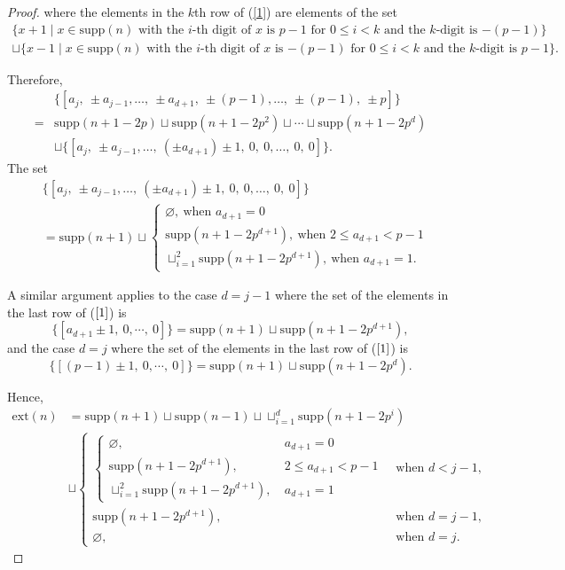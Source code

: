 \documentclass[11 pt]{amsart}
\theoremstyle{plain}
\theoremstyle{definition}
\theoremstyle{remark}
\def\supp{\text{supp}}
\def\ext{\text{ext}}
\begin{document}
\begin{proof}
where the elements in the $k$th row of (\ref{1}) are elements of the set  
\begin{align*}
  \{x+1 \mid x \in \supp (n) \text{ with the $i$-th digit of $x$ is $p-1$ for $0\le i<k$ and the $k$-digit is $-(p-1)$} \} \\
  \sqcup \{x-1 \mid x \in \supp (n) \text{ with the $i$-th digit of $x$ is $-(p-1)$ for $0\le i<k$ and the $k$-digit is $p-1$} \}.
\end{align*}

Therefore, 
\begin{align*}
 &\{[a_j,\ \pm a_{j-1}, \ldots,\ \pm  a_{d+1},\ \pm (p-1), \ldots, \ \pm (p-1), \ \pm p] \} \\
 = &\supp(n+1-2p)\sqcup \supp (n+1-2p^2) \sqcup \cdots \sqcup \supp(n+1-2p^d) \\ &\sqcup \{[a_j,\ \pm a_{j-1}, \ldots,\  (\pm a_{d+1})\pm 1,\ 0,\ 0, \ldots,  \ 0, \ 0]  
    \}. 
\end{align*}
The set 
\begin{align*}
        &\{[a_j,\ \pm a_{j-1}, \ldots,\  (\pm a_{d+1})\pm 1,\ 0,\ 0, \ldots,  \ 0, \ 0]  
    \}\\
    &=\supp(n+1) \sqcup \begin{cases}
         \varnothing,\ \text{when } a_{d+1}=0 \\
        \supp(n+1-2p^{d+1}),\ \text{when } 2\le a_{d+1}<p-1\\
        \sqcup_{i=1}^2 \supp(n+1-2p^{d+1}),\ \text{when } a_{d+1}=1.
    \end{cases}
\end{align*}

A similar argument applies to the case $d=j-1$ where the set of the elements in the last row of ($\ref{1}$) is $$\{[a_{d+1}\pm 1,\ 0, \cdots, \ 0]\}=\supp(n+1) \sqcup \supp (n+1-2p^{d+1}),$$ and the case $d=j$ where the set of the elements in the last row of ($\ref{1}$) is $$\{[(p-1)\pm 1,\ 0, \cdots, \ 0]\}=\supp(n+1) \sqcup \supp(n+1-2p^d).$$

Hence, 
\begin{align*}
    \ext(n)&=\supp(n+1) \sqcup \supp (n-1) \sqcup \sqcup_{i=1}^d \supp(n+1-2p^i)\\
    &\sqcup \begin{cases}
        \begin{cases}
         \varnothing,\ & a_{d+1}=0 \\
        \supp(n+1-2p^{d+1}),\ & 2\le a_{d+1}<p-1\\
        \sqcup_{i=1}^2 \supp(n+1-2p^{d+1}),\ & a_{d+1}=1\end{cases}\ &\text{when } d<j-1,\\    
\supp(n+1-2p^{d+1}),\ &\text{when } d=j-1,\\
\varnothing,\ &\text{when } d=j. \end{cases}
\end{align*}
\end{proof}
\end{document}
